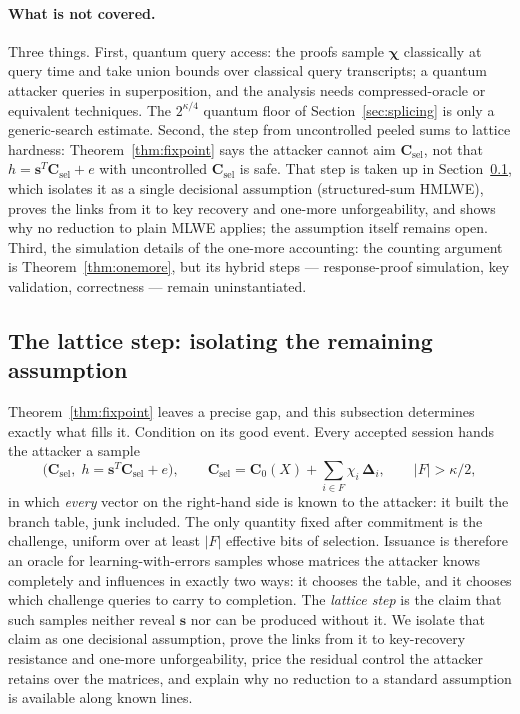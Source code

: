 \documentclass[11pt]{article}
\begin{document}
\paragraph{What is not covered.}
Three things.  First, quantum query access: the proofs sample
$\boldsymbol\chi$ classically at query time and take union bounds over
classical query transcripts; a quantum attacker queries in superposition, and
the analysis needs compressed-oracle or equivalent techniques.  The
$2^{\kappa/4}$ quantum floor of Section~\ref{sec:splicing} is only a
generic-search estimate.  Second, the step from uncontrolled peeled sums to
lattice hardness: Theorem~\ref{thm:fixpoint} says the attacker cannot aim
$\mathbf C_{\mathrm{sel}}$, not that
$h=\mathbf s^{T}\mathbf C_{\mathrm{sel}}+e$ with uncontrolled
$\mathbf C_{\mathrm{sel}}$ is safe.  That step is taken up in
Section~\ref{sec:latticestep}, which isolates it as a single decisional
assumption (structured-sum HMLWE), proves the links from it to key recovery
and one-more unforgeability, and shows why no reduction to plain MLWE
applies; the assumption itself remains open.  Third, the simulation details
of the one-more accounting: the counting argument is
Theorem~\ref{thm:onemore}, but its hybrid steps --- response-proof
simulation, key validation, correctness --- remain uninstantiated.

\subsection{The lattice step: isolating the remaining assumption}
\label{sec:latticestep}

Theorem~\ref{thm:fixpoint} leaves a precise gap, and this subsection
determines exactly what fills it.  Condition on its good event.  Every
accepted session hands the attacker a sample
\[
 \bigl(\mathbf C_{\mathrm{sel}},\;h=\mathbf s^{T}\mathbf
 C_{\mathrm{sel}}+e\bigr),
 \qquad
 \mathbf C_{\mathrm{sel}}
 =\mathbf C_0(X)+\sum_{i\in F}\chi_i\,\boldsymbol\Delta_i,
 \qquad |F|>\kappa/2,
\]
in which \emph{every} vector on the right-hand side is known to the
attacker: it built the branch table, junk included.  The only quantity fixed
after commitment is the challenge, uniform over at least $|F|$ effective
bits of selection.  Issuance is therefore an oracle for
learning-with-errors samples whose matrices the attacker knows completely
and influences in exactly two ways: it chooses the table, and it chooses
which challenge queries to carry to completion.  The \emph{lattice step} is
the claim that such samples neither reveal $\mathbf s$ nor can be produced
without it.  We isolate that claim as one decisional assumption, prove the
links from it to key-recovery resistance and one-more unforgeability, price
the residual control the attacker retains over the matrices, and explain why
no reduction to a standard assumption is available along known lines.
\end{document}
